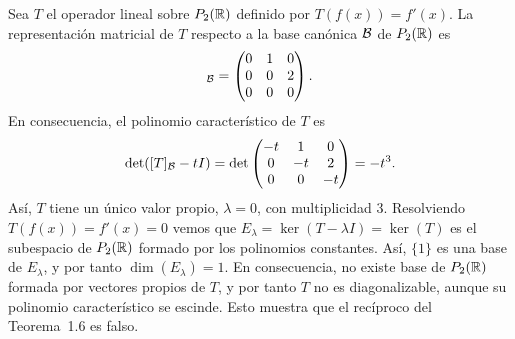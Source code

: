 \documentclass[12pt,a4paper]{book}
\begin{document}
    \begin{ejemplo}
        Sea $T$ el operador lineal sobre $P_2(\mathbb{R})$ definido por $T(f(x))=f'(x)$. La representación matricial de $T$ respecto a la base canónica $\mathcal{B}$ de $P_2(\mathbb{R})$ es
        \begin{equation*}
            [T]_{\BB}=\begin{pmatrix}0&1&0\\0&0&2\\0&0&0\end{pmatrix}.
        \end{equation*}
        En consecuencia, el polinomio característico de $T$ es
        \begin{equation*}
            \det([T]_{\mathcal{B}}-tI)=\det\begin{pmatrix}-t&1&0\\0&-t&2\\0&0&-t\end{pmatrix}=-t^3.
        \end{equation*}
        Así, $T$ tiene un único valor propio, $\lambda=0$, con multiplicidad $3$. Resolviendo $T(f(x))=f'(x)=0$ vemos que $E_\lambda=\ker(T-\lambda I)=\ker(T)$ es el subespacio de $P_2(\mathbb{R})$ formado por los polinomios constantes. Así, $\{1\}$ es una base de $E_\lambda$, y por tanto $\dim(E_\lambda)=1$. En consecuencia, no existe base de $P_2(\mathbb{R})$ formada por vectores propios de $T$, y por tanto $T$ no es diagonalizable, aunque su polinomio característico se escinde. Esto muestra que el recíproco del Teorema~1.6 es falso.
    \end{ejemplo}
\end{document}
